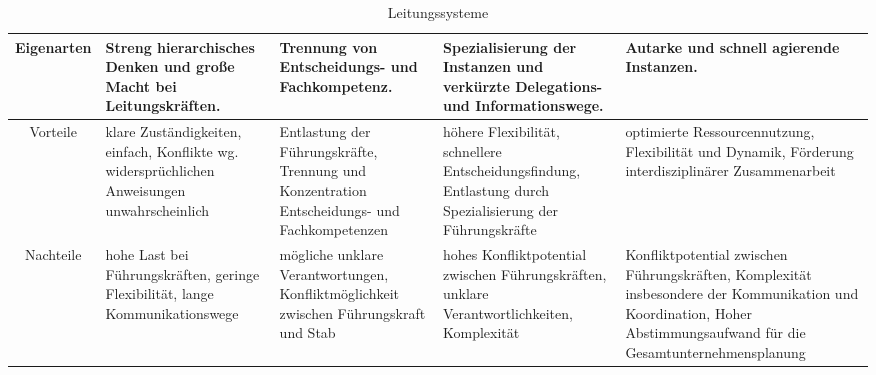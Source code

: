 \begin{table}[H]
\begin{tabularx}{\textwidth}{|c|X|X|X|X|}
        \hline
        Eigenarten & Streng hierarchisches Denken und große Macht bei Leitungskräften.                                                                                        & Trennung von Entscheidungs- und Fachkompetenz.                                                                                    & Spezialisierung der Instanzen und verkürzte Delegations- und Informationswege.                                                                                                                                                                            & Autarke und schnell agierende Instanzen.                                                                                                                                                                                                                            \\
        \hline
        Vorteile   & klare Zuständigkeiten, einfach, Konflikte wg. widersprüchlichen Anweisungen unwahrscheinlich                                                             & Entlastung der Führungskräfte, Trennung und Konzentration Entscheidungs- und Fachkompetenzen                                      & höhere Flexibilität, schnellere Entscheidungsfindung, Entlastung durch Spezialisierung der Führungskräfte                                                                                                                                                 & optimierte Ressourcennutzung, Flexibilität und Dynamik, Förderung interdisziplinärer Zusammenarbeit                                                                                                                                                                 \\
        \hline
        Nachteile  & hohe Last bei Führungskräften, geringe Flexibilität, lange Kommunikationswege                                                                            & mögliche unklare Verantwortungen, Konfliktmöglichkeit zwischen Führungskraft und Stab                                             & hohes Konfliktpotential zwischen Führungskräften, unklare Verantwortlichkeiten, Komplexität                                                                                                                                                               & Konfliktpotential zwischen Führungskräften, Komplexität insbesondere der Kommunikation und Koordination, Hoher Abstimmungsaufwand für die Gesamtunternehmensplanung                                                                                                 \\
        \hline
    \end{tabularx}
    \caption{Leitungssysteme}
    \label{tab:leitungssysteme}
\end{table}


